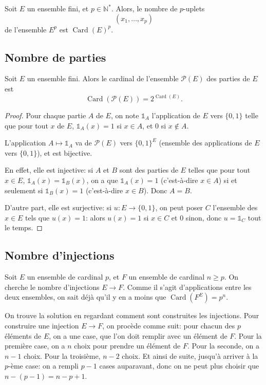 \documentclass[11pt]{article}
\newcommand{\N}{\mathbb N}
\DeclareMathOperator{\Card}{\mathrm{Card}}
\theoremstyle{definition}
\theoremstyle{remark}
\theoremstyle{theorem}
\begin{document}
\begin{prop}
	Soit $E$ un ensemble fini, et $p\in\N^*$. Alors, le nombre de $p$-uplets
	\[ (x_1,\ldots,x_p) \]
	de l'ensemble $E^p$ est $\Card(E)^p$.
\end{prop}

\subsection{Nombre de parties}

\begin{prop}
	Soit $E$ un ensemble fini. Alors le cardinal de l'ensemble $\mathcal{P}(E)$ des parties de $E$ est
	\[ \Card\left(\mathcal P(E)\right) = 2^{\Card(E)}. \]
\end{prop}

\begin{proof}
	Pour chaque partie $A$ de $E$, on note $\mathbb{1}_A$ l'application de $E$ vers $\{0,1\}$ telle que pour tout $x$ de $E$, $\mathbb{1}_A(x)= 1$ si $x\in A$, et $0$ si $x\not\in A$.
	
	L'application $A\longmapsto\mathbb{1}_A$ va de $\mathcal{P}(E)$ vers $\{0,1\}^E$ (ensemble des applications de $E$ vers $\{0,1\}$), et est bijective. 
	
	En effet, elle est injective: si $A$ et $B$ sont des parties de $E$ telles que pour tout $x\in E$, $\mathbb 1_A(x) = \mathbb 1_B(x)$, on a que $\mathbb 1_A(x) = 1$ (c'est-à-dire $x\in A$) si et seulement si $\mathbb 1_B(x) = 1$ (c'est-à-dire $x\in B$). Donc $A=B$.
	
	D'autre part, elle est surjective: si $u:E\rightarrow\{0,1\}$, on peut poser $C$ l'ensemble des $x\in E$ tels que $u(x) = 1$: alors $u(x) = 1$ si $x\in C$ et $0$ sinon, donc $u = \mathbb 1_C$ tout le temps.
\end{proof}

\subsection{Nombre d'injections}

Soit $E$ un ensemble de cardinal $p$, et $F$ un ensemble de cardinal $n\geq p$. On cherche le nombre d'injections $E\rightarrow F$. Comme il s'agit d'applications entre les deux ensembles, on sait déjà qu'il y en a moins que $\Card(F^E) = p^n$.

On trouve la solution en regardant comment sont construites les injections. Pour construire une injection $E\rightarrow F$, on procède comme suit: pour chacun des $p$ éléments de $E$, on a une case, que l'on doit remplir avec un élément de $F$. Pour la première case, on a $n$ choix pour prendre un élément de $F$. Pour la seconde, on a $n-1$ choix. Pour la troisième, $n-2$ choix. Et ainsi de suite, jusqu'à arriver à la $p$-ème case: on a rempli $p-1$ cases auparavant, donc on ne peut plus choisir que $n-(p-1)=n-p+1$.
\end{document}
